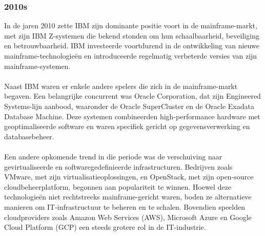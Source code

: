 \subsubsection{2010s}
\label{sec:2010s}
In de jaren 2010 zette IBM zijn dominante positie voort in de mainframe-markt, met zijn IBM Z-systemen die bekend stonden om hun schaalbaarheid, beveiliging en betrouwbaarheid. IBM investeerde voortdurend in de ontwikkeling van nieuwe mainframe-technologieën en introduceerde regelmatig verbeterde versies van zijn mainframe-systemen. \autocite{Goldberg2020}
\\ \\
Naast IBM waren er enkele andere spelers die zich in de mainframe-markt begaven. Een belangrijke concurrent was Oracle Corporation, dat zijn Engineered Systems-lijn aanbood, waaronder de Oracle SuperCluster en de Oracle Exadata Database Machine. Deze systemen combineerden high-performance hardware met geoptimaliseerde software en waren specifiek gericht op gegevensverwerking en databasebeheer. \autocite{Oracle}
\\ \\
Een andere opkomende trend in die periode was de verschuiving naar gevirtualiseerde en softwaregedefinieerde infrastructuren. Bedrijven zoals VMware, met zijn virtualisatieoplossingen, en OpenStack, met zijn open-source cloudbeheerplatform, begonnen aan populariteit te winnen. Hoewel deze technologieën niet rechtstreeks mainframe-gericht waren, boden ze alternatieve manieren om IT-infrastructuur te beheren en te schalen. Bovendien speelden cloudproviders zoals Amazon Web Services (AWS), Microsoft Azure en Google Cloud Platform (GCP) een steeds grotere rol in de IT-industrie. \autocite{Google} \autocite{AWS} \autocite{VMWare}
\\ \\
